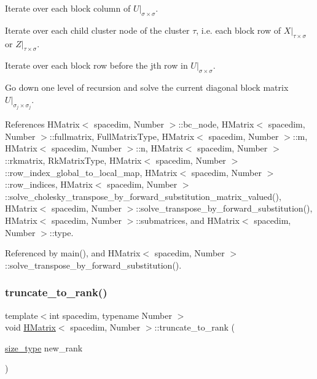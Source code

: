 Iterate over each block column of $U\vert_{\sigma\times\sigma}$.

Iterate over each child cluster node of the cluster $\tau$, i.\+e. each block row of $X\vert_{\tau\times\sigma}$ or $Z\vert_{\tau\times\sigma}$.

Iterate over each block row before the j\textquotesingle{}th row in $U\vert_{\sigma\times\sigma}$.

Go down one level of recursion and solve the current diagonal block matrix $U\vert_{\sigma_j\times\sigma_j}$.

References H\+Matrix$<$ spacedim, Number $>$\+::bc\+\_\+node, H\+Matrix$<$ spacedim, Number $>$\+::fullmatrix, Full\+Matrix\+Type, H\+Matrix$<$ spacedim, Number $>$\+::m, H\+Matrix$<$ spacedim, Number $>$\+::n, H\+Matrix$<$ spacedim, Number $>$\+::rkmatrix, Rk\+Matrix\+Type, H\+Matrix$<$ spacedim, Number $>$\+::row\+\_\+index\+\_\+global\+\_\+to\+\_\+local\+\_\+map, H\+Matrix$<$ spacedim, Number $>$\+::row\+\_\+indices, H\+Matrix$<$ spacedim, Number $>$\+::solve\+\_\+cholesky\+\_\+transpose\+\_\+by\+\_\+forward\+\_\+substitution\+\_\+matrix\+\_\+valued(), H\+Matrix$<$ spacedim, Number $>$\+::solve\+\_\+transpose\+\_\+by\+\_\+forward\+\_\+substitution(), H\+Matrix$<$ spacedim, Number $>$\+::submatrices, and H\+Matrix$<$ spacedim, Number $>$\+::type.



Referenced by main(), and H\+Matrix$<$ spacedim, Number $>$\+::solve\+\_\+transpose\+\_\+by\+\_\+forward\+\_\+substitution().

\mbox{\label{classHMatrix_a64be687cacd167efc12b892aa154dcd3}} 
\subsubsection{\texorpdfstring{truncate\+\_\+to\+\_\+rank()}{truncate\_to\_rank()}}
{\footnotesize\ttfamily template$<$int spacedim, typename Number $>$ \\
void \hyperlink{classHMatrix}{H\+Matrix}$<$ spacedim, Number $>$\+::truncate\+\_\+to\+\_\+rank (\begin{DoxyParamCaption}\item[{\hyperlink{classHMatrix_a5ca8dc549783d38371a01ecd621ecb34}{size\+\_\+type}}]{new\+\_\+rank }\end{DoxyParamCaption})}

